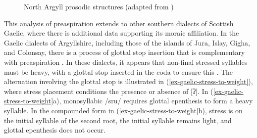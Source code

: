 \documentclass[output=paper,colorlinks,citecolor=brown]{langscibook}
\begin{document}
\begin{figure} 
\caption{North Argyll prosodic structures (adapted from \citealp{iosadetal2015})}
\label{ex-north-argyll-prosodic-structures}
\hspace{3em}
\end{figure}

\begin{sloppypar}
This analysis of preaspiration extends to other southern dialects of Scottish Gaelic, where there is additional data supporting its moraic affiliation. In the Gaelic dialects of Argyllshire, including those of the islands of Jura, Islay, Gigha, and Colonsay, there is a process of glottal stop insertion that is complementary with preaspiration \citep{sgds,smith1999,jones2006,jones2009,scouller2017,morrison2019,iosad2021}. In these dialects, it appears that non-final stressed syllables must be heavy, with a glottal stop inserted in the coda to ensure this \citep{iosadetal2015}. The alternation involving the glottal stop is illustrated in (\ref{ex-gaelic-stress-to-weight}), where stress placement conditions the presence or absence of [ʔ]. In (\ref{ex-gaelic-stress-to-weight}a), monosyllabic  /sru/ requires glottal epenthesis to form a heavy syllable. In the compounded form in (\ref{ex-gaelic-stress-to-weight}b), stress is on the initial syllable of the second root, the initial syllable remains light, and glottal epenthesis does not occur.
\end{sloppypar}
\end{document}
